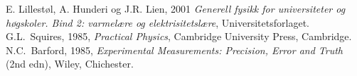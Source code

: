 \begin{thebibliography}{99}

  E. Lillestøl, A. Hunderi og J.R. Lien, 2001 \textit{Generell fysikk for universiteter og høgskoler. Bind 2: varmelære og elektrisitetslære\/}, Universitetsforlaget. \\


  G.L.\ Squires, 1985, \textit{Practical Physics\/}, Cambridge University Press, Cambridge. 
  N.C.\ Barford, 1985, \textit{Experimental Measurements: Precision, Error and Truth\/} (2nd edn), Wiley, Chichester. 


\end{thebibliography}
